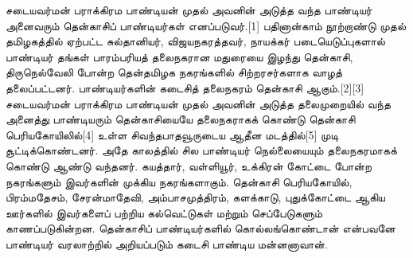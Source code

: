 \documentclass[a4paper,12pt,oneside,final]{article}
\begin{document}
சடையவர்மன் பராக்கிரம பாண்டியன் முதல் அவனின் அடுத்த வந்த பாண்டியர் அனைவரும் தென்காசிப் பாண்டியர்கள் எனப்படுவர்.[1] பதினான்காம் நூற்றாண்டு முதல் தமிழகத்தில் ஏற்பட்ட சுல்தானியர், விஜயநகரத்தவர், நாயக்கர் படையெடுப்புகளால் பாண்டியர் தங்கள் பாரம்பரியத் தலைநகரான மதுரையை இழந்து தென்காசி, திருநெல்வேலி போன்ற தென்தமிழக நகரங்களில் சிற்றரசர்களாக வாழத் தலைப்பட்டனர். பாண்டியர்களின் கடைசித் தலைநகரம் தென்காசி ஆகும்.[2][3] சடையவர்மன் பராக்கிரம பாண்டியன் முதல் அவனின் அடுத்த தலைமுறையில் வந்த அனைத்து பாண்டியரும் தென்காசியையே தலைநகராகக் கொண்டு தென்காசி பெரியகோயிலில்[4] உள்ள சிவந்தபாதவூருடைய ஆதீன மடத்தில்[5] முடி சூட்டிக்கொண்டனர். அதே காலத்தில் சில பாண்டியர் நெல்லையையும் தலைநகரமாகக் கொண்டு ஆண்டு வந்தனர். கயத்தார், வள்ளியூர், உக்கிரன் கோட்டை போன்ற நகரங்களும் இவர்களின் முக்கிய நகரங்களாகும். தென்காசி பெரியகோயில், பிரம்மதேசம், சேரன்மாதேவி, அம்பாசமுத்திரம், களக்காடு, புதுக்கோட்டை ஆகிய ஊர்களில் இவர்களைப் பற்றிய கல்வெட்டுகள் மற்றும் செப்பேடுகளும் காணப்படுகின்றன. தென்காசிப் பாண்டியர்களில் கொல்லங்கொண்டான் என்பவனே பாண்டியர் வரலாற்றில் அறியப்படும் கடைசி பாண்டிய மன்னனாவான்.
\end{document}
